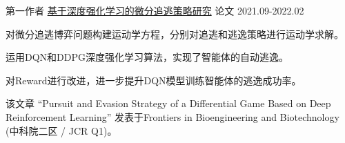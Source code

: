 \begin{cventries}
\cventry
{第一作者} %
{\href{https://www.frontiersin.org/articles/10.3389/fbioe.2022.827408/full}{基于深度强化学习的微分追逃策略研究}} %
{论文} %
{2021.09-2022.02} %
{
  \begin{cvitems} %
    \item {对微分追逃博弈问题构建运动学方程，分别对追逃和逃逸策略进行运动学求解。}
    \item {运用DQN和DDPG深度强化学习算法，实现了智能体的自动逃逸。}
    \item {对Reward进行改进，进一步提升DQN模型训练智能体的逃逸成功率。}
    \item {该文章 “Pursuit and Evasion Strategy of a Differential Game Based on Deep Reinforcement Learning” 发表于Frontiers in Bioengineering and Biotechnology (中科院二区 / JCR Q1)。}
  \end{cvitems}
}



\end{cventries}
